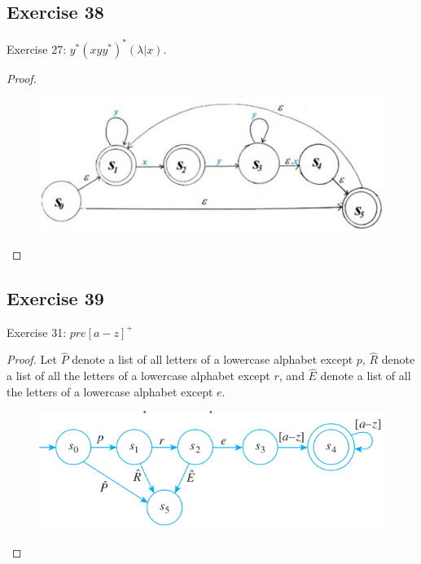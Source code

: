 \documentclass[14pt]{extarticle}
\begin{document}
\subsection{Exercise 38}
Exercise 27: \(y^*(xyy^*)^*(\lambda | x)\).
\begin{proof}
\begin{figure}[ht!]
\centering
\includegraphics[scale=0.3]{../images/12.2.38.png}
\end{figure}
\end{proof}

\subsection{Exercise 39}
Exercise 31:  \(pre[a - z]^+\)
\begin{proof}
Let \(\hat{P}\) denote a list of all letters of a lowercase alphabet except \(p\), \(\hat{R}\) denote a list of all the 
letters of a lowercase alphabet except \(r\), and \(\hat{E}\) denote a list of all the letters of a lowercase alphabet 
except \(e\).

\begin{figure}[ht!]
\centering
\includegraphics[scale=0.5]{../images/12.2.39.png}
\end{figure}
\end{proof}
\end{document}
